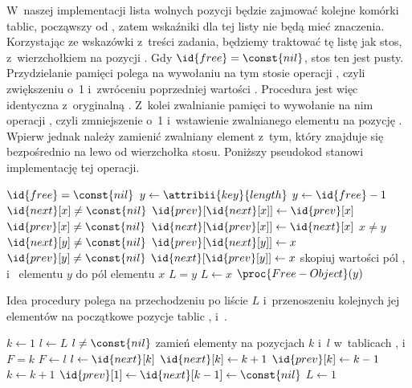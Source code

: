 \exercise %
W~naszej implementacji lista wolnych pozycji będzie zajmować kolejne komórki tablic, począwszy od , zatem wskaźniki  dla tej listy nie będą mieć znaczenia.
Korzystając ze wskazówki z~treści zadania, będziemy traktować tę listę jak stos, z~wierzchołkiem na pozycji .
Gdy $\id{free}=\const{nil}$, stos ten jest pusty.
Przydzielanie pamięci polega na wywołaniu na tym stosie operacji , czyli zwiększeniu  o~1 i~zwróceniu poprzedniej wartości .
Procedura  jest więc identyczna z~oryginalną .
Z~kolei zwalnianie pamięci to wywołanie na nim operacji , czyli zmniejszenie  o~1 i~wstawienie zwalnianego elementu na pozycję .
Wpierw jednak należy zamienić zwalniany element z~tym, który znajduje się bezpośrednio na lewo od wierzchołka stosu.
Poniższy pseudokod stanowi implementację tej operacji.
\begin{codebox}
\li	\If $\id{free}=\const{nil}$
\li		\Then $y\gets\attribii{key}{length}$
\li		\Else $y\gets\id{free}-1$
		\End
\li	\If $\id{next}[x]\ne\const{nil}$
\li		\Then $\id{prev}[\id{next}[x]]\gets\id{prev}[x]$
		\End
\li	\If $\id{prev}[x]\ne\const{nil}$
\li		\Then $\id{next}[\id{prev}[x]]\gets\id{next}[x]$
		\End
\li	\If $x\ne y$
\li		\Then \If $\id{next}[y]\ne\const{nil}$
\li				\Then $\id{prev}[\id{next}[y]]\gets x$
				\End
\li			\If $\id{prev}[y]\ne\const{nil}$
\li				\Then $\id{next}[\id{prev}[y]]\gets x$
				\End
		\End
\li	skopiuj wartości pól ,  i~ elementu $y$ do pól elementu $x$
\li	\If $L=y$
\li		\Then $L\gets x$
		\End
\li	$\proc{Free-Object}(y)$
\end{codebox}

\exercise %
Idea procedury  polega na przechodzeniu po liście $L$ i~przenoszeniu kolejnych jej elementów na początkowe pozycje tablic ,  i~.
\begin{codebox}
\li	$k\gets1$
\li	$l\gets L$
\li	\While $l\ne\const{nil}$ \label{li:compactify-list-while-begin}
\li		\Do zamień elementy na pozycjach $k$ i~$l$ w~tablicach ,  i~
\li			\If $F=k$
\li				\Then $F\gets l$
				\End
\li			$l\gets\id{next}[k]$
\li			$\id{next}[k]\gets k+1$
\li			$\id{prev}[k]\gets k-1$
\li			$k\gets k+1$
		\End \label{li:compactify-list-while-end}
\li	$\id{prev}[1]\gets\id{next}[k-1]\gets\const{nil}$
\li	$L\gets1$
\end{codebox}

